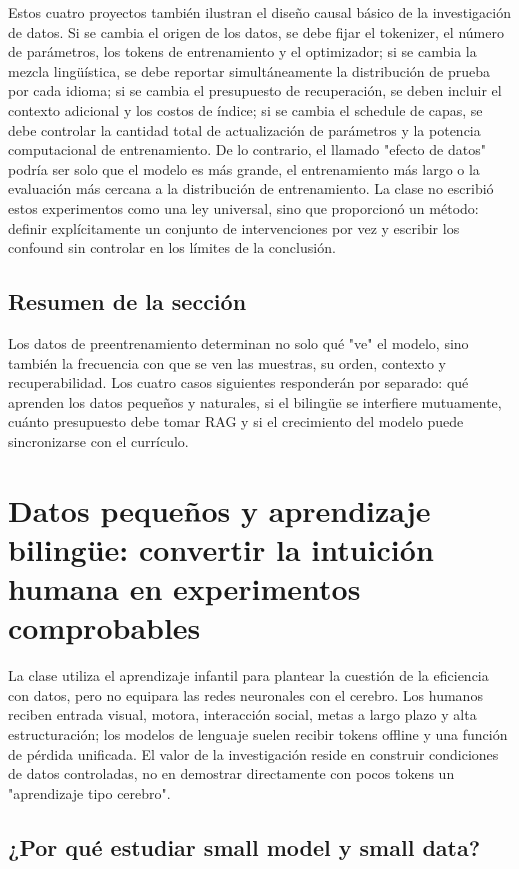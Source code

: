 \documentclass[a4paper]{article}
\begin{document}
Estos cuatro proyectos también ilustran el diseño causal básico de la investigación de datos. Si se cambia el origen de los datos, se debe fijar el tokenizer, el número de parámetros, los tokens de entrenamiento y el optimizador; si se cambia la mezcla lingüística, se debe reportar simultáneamente la distribución de prueba por cada idioma; si se cambia el presupuesto de recuperación, se deben incluir el contexto adicional y los costos de índice; si se cambia el schedule de capas, se debe controlar la cantidad total de actualización de parámetros y la potencia computacional de entrenamiento. De lo contrario, el llamado "efecto de datos" podría ser solo que el modelo es más grande, el entrenamiento más largo o la evaluación más cercana a la distribución de entrenamiento. La clase no escribió estos experimentos como una ley universal, sino que proporcionó un método: definir explícitamente un conjunto de intervenciones por vez y escribir los confound sin controlar en los límites de la conclusión.

\subsection{Resumen de la sección}

Los datos de preentrenamiento determinan no solo qué "ve" el modelo, sino también la frecuencia con que se ven las muestras, su orden, contexto y recuperabilidad. Los cuatro casos siguientes responderán por separado: qué aprenden los datos pequeños y naturales, si el bilingüe se interfiere mutuamente, cuánto presupuesto debe tomar RAG y si el crecimiento del modelo puede sincronizarse con el currículo.
\section{Datos pequeños y aprendizaje bilingüe: convertir la intuición humana en experimentos comprobables}

La clase utiliza el aprendizaje infantil para plantear la cuestión de la eficiencia con datos, pero no equipara las redes neuronales con el cerebro. Los humanos reciben entrada visual, motora, interacción social, metas a largo plazo y alta estructuración; los modelos de lenguaje suelen recibir tokens offline y una función de pérdida unificada. El valor de la investigación reside en construir condiciones de datos controladas, no en demostrar directamente con pocos tokens un "aprendizaje tipo cerebro".

\subsection{¿Por qué estudiar small model y small data?}
\end{document}
